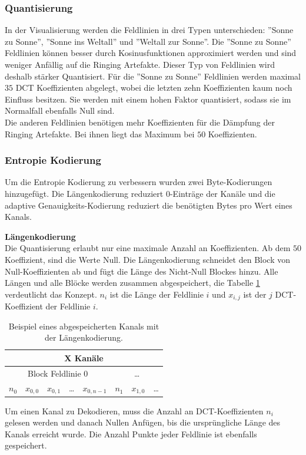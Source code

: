 \subsubsection{Quantisierung}
In der Visualisierung werden die Feldlinien in drei Typen unterschieden: ''Sonne zu Sonne'', ''Sonne ins Weltall'' und ''Weltall zur Sonne''.  Die ''Sonne zu Sonne'' Feldlinien können besser durch Kosinusfunktionen approximiert werden und sind weniger Anfällig auf die Ringing Artefakte. Dieser Typ von Feldlinien wird deshalb stärker Quantisiert. Für die ''Sonne zu Sonne'' Feldlinien werden maximal $35$ DCT Koeffizienten abgelegt, wobei die letzten zehn Koeffizienten kaum noch Einfluss besitzen. Sie werden mit einem hohen Faktor quantisiert, sodass sie im Normalfall ebenfalls Null sind.\\
Die anderen Feldlinien benötigen mehr Koeffizienten für die Dämpfung der Ringing Artefakte. Bei ihnen liegt das Maximum bei $50$ Koeffizienten.

\subsubsection{Entropie Kodierung}\label{konzept:loesung1:kodierung}
Um die Entropie Kodierung zu verbessern wurden zwei Byte-Kodierungen hinzugefügt. Die Längenkodierung reduziert 0-Einträge der Kanäle und die adaptive Genauigkeits-Kodierung reduziert die benötigten Bytes pro Wert eines Kanals.

\textbf{Längenkodierung}\\
Die Quantisierung erlaubt nur eine maximale Anzahl an Koeffizienten. Ab dem $50$ Koeffizient, sind die Werte Null. Die Längenkodierung schneidet den Block von Null-Koeffizienten ab und fügt die Länge des Nicht-Null Blockes hinzu. Alle Längen und alle Blöcke werden zusammen abgespeichert, die Tabelle \ref{konzept:loesung1:entropie:laengenkodierung} verdeutlicht das Konzept. $n_i$ ist die Länge der Feldlinie $i$ und $x_{i,j}$ ist der $j$ DCT-Koeffizient der Feldlinie $i$.

\begin{table}[!htbp]
	\center
	\begin{tabular}{||c|c|c|c|c||c|c|c}
		\hline
		\multicolumn{8}{|c|}{X Kanäle}\\\hline\hline
		 \multicolumn{5}{||c||}{Block Feldlinie 0} & \multicolumn{3}{c}{\ldots} \\\hline
		$n_0$ &$x_{0,0}$ &$x_{0,1}$ & \ldots & $x_{0,n-1}$ & $n_1$ & $x_{1,0}$ & \ldots\\\hline
	\end{tabular}
	\caption{Beispiel eines abgespeicherten Kanals mit der Längenkodierung.}
	\label{konzept:loesung1:entropie:laengenkodierung}
\end{table}
Um einen Kanal zu Dekodieren, muss die Anzahl an DCT-Koeffizienten $n_i$ gelesen werden und danach Nullen Anfügen, bis die ursprüngliche Länge des Kanals erreicht wurde. Die Anzahl Punkte jeder Feldlinie ist ebenfalls gespeichert.

